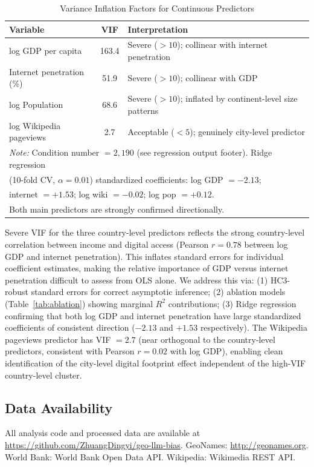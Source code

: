 \documentclass[12pt]{article}
\begin{document}
\begin{table}[htbp]
\caption{Variance Inflation Factors for Continuous Predictors}
\label{tab:vif}
\centering
\begin{tabular}{lcp{6cm}}
\toprule
Variable & VIF & Interpretation \\
\midrule
log GDP per capita & 163.4 & Severe ($> 10$); collinear with internet penetration \\
Internet penetration (\%) & 51.9 & Severe ($> 10$); collinear with GDP \\
log Population & 68.6 & Severe ($> 10$); inflated by continent-level size patterns \\
log Wikipedia pageviews & 2.7 & Acceptable ($< 5$); genuinely city-level predictor \\
\bottomrule
\multicolumn{3}{l}{\textit{Note:} Condition number $= 2{,}190$ (see regression output footer). Ridge regression} \\
\multicolumn{3}{l}{(10-fold CV, $\alpha = 0.01$) standardized coefficients: log GDP $= -2.13$;} \\
\multicolumn{3}{l}{internet $= +1.53$; log wiki $= -0.02$; log pop $= +0.12$.} \\
\multicolumn{3}{l}{Both main predictors are strongly confirmed directionally.} \\
\end{tabular}
\end{table}

Severe VIF for the three country-level predictors reflects the strong country-level correlation between income and digital access (Pearson $r = 0.78$ between log GDP and internet penetration). This inflates standard errors for individual coefficient estimates, making the relative importance of GDP versus internet penetration difficult to assess from OLS alone. We address this via: (1) HC3-robust standard errors for correct asymptotic inference; (2) ablation models (Table~\ref{tab:ablation}) showing marginal $R^2$ contributions; (3) Ridge regression confirming that both log GDP and internet penetration have large standardized coefficients of consistent direction ($-2.13$ and $+1.53$ respectively). The Wikipedia pageviews predictor has VIF $= 2.7$ (near orthogonal to the country-level predictors, consistent with Pearson $r = 0.02$ with log GDP), enabling clean identification of the city-level digital footprint effect independent of the high-VIF country-level cluster.

\subsection{Data Availability}

All analysis code and processed data are available at \url{https://github.com/ZhuangDingyi/geo-llm-bias}. GeoNames: \url{http://geonames.org}. World Bank: World Bank Open Data API. Wikipedia: Wikimedia REST API.
\end{document}
